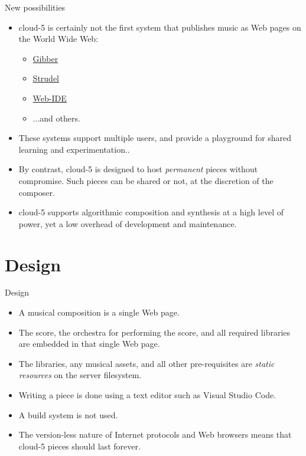\documentclass{beamer}
\begin{document}
\begin{frame}{New possibilities}
\begin{itemize}
\item cloud-5 is certainly not the first system that publishes music as Web pages on the World Wide Web:
\begin{itemize}
\item \href{https://gibber.cc/playground/}{Gibber}
\item \href{https://strudel.cc/}{Strudel}
\item \href{https://ide.csound.com/}{Web-IDE}
\item ...and others.
\end{itemize}
\item These systems support multiple users, and provide a playground for shared learning and experimentation..
\item By contrast, cloud-5 is designed to host \emph{permanent} pieces without compromise. Such pieces can be shared or not, at the discretion of the composer.
\item cloud-5 supports algorithmic composition and synthesis at a high level of power, yet a low overhead of development and maintenance.
\end{itemize}
\end{frame}

\section{Design}

\begin{frame}{Design}
\begin{itemize}
\item A musical composition is a single Web page.
\item The score, the orchestra for performing the score, and all required libraries are embedded in that single Web page.
\item The libraries, any musical assets, and all other pre-requisites are \emph{static resources} on the server filesystem.
\item Writing a piece is done using a text editor such as Visual Studio Code.
\item A build system is not used.
\item The version-less nature of Internet protocols and Web browsers means that cloud-5 pieces should last forever.
\end{itemize}
\end{frame}
\end{document}
